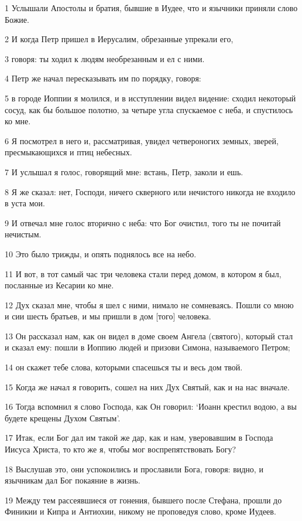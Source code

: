 \par 1 Услышали Апостолы и братия, бывшие в Иудее, что и язычники приняли слово Божие.
\par 2 И когда Петр пришел в Иерусалим, обрезанные упрекали его,
\par 3 говоря: ты ходил к людям необрезанным и ел с ними.
\par 4 Петр же начал пересказывать им по порядку, говоря:
\par 5 в городе Иоппии я молился, и в исступлении видел видение: сходил некоторый сосуд, как бы большое полотно, за четыре угла спускаемое с неба, и спустилось ко мне.
\par 6 Я посмотрел в него и, рассматривая, увидел четвероногих земных, зверей, пресмыкающихся и птиц небесных.
\par 7 И услышал я голос, говорящий мне: встань, Петр, заколи и ешь.
\par 8 Я же сказал: нет, Господи, ничего скверного или нечистого никогда не входило в уста мои.
\par 9 И отвечал мне голос вторично с неба: что Бог очистил, того ты не почитай нечистым.
\par 10 Это было трижды, и опять поднялось все на небо.
\par 11 И вот, в тот самый час три человека стали перед домом, в котором я был, посланные из Кесарии ко мне.
\par 12 Дух сказал мне, чтобы я шел с ними, нимало не сомневаясь. Пошли со мною и сии шесть братьев, и мы пришли в дом [того] человека.
\par 13 Он рассказал нам, как он видел в доме своем Ангела (святого), который стал и сказал ему: пошли в Иоппию людей и призови Симона, называемого Петром;
\par 14 он скажет тебе слова, которыми спасешься ты и весь дом твой.
\par 15 Когда же начал я говорить, сошел на них Дух Святый, как и на нас вначале.
\par 16 Тогда вспомнил я слово Господа, как Он говорил: `Иоанн крестил водою, а вы будете крещены Духом Святым'.
\par 17 Итак, если Бог дал им такой же дар, как и нам, уверовавшим в Господа Иисуса Христа, то кто же я, чтобы мог воспрепятствовать Богу?
\par 18 Выслушав это, они успокоились и прославили Бога, говоря: видно, и язычникам дал Бог покаяние в жизнь.
\par 19 Между тем рассеявшиеся от гонения, бывшего после Стефана, прошли до Финикии и Кипра и Антиохии, никому не проповедуя слово, кроме Иудеев.
